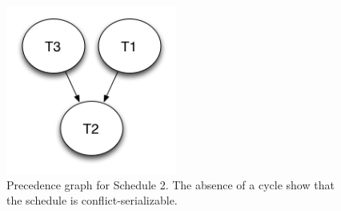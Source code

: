 \begin{figure}[H]
  \centering
  \includegraphics[width=0.5\textwidth]{images/schedule2}
  \footnotesize
  \caption{Precedence graph for Schedule 2. The absence of a cycle show that the
  schedule is conflict-serializable.}
  \label{fig:schedule2}
\end{figure}
